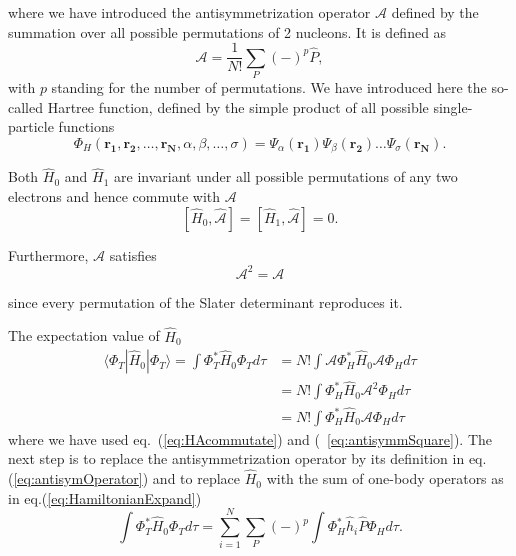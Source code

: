 where we have introduced the antisymmetrization operator $\mathcal{A}$ defined by the summation over all possible permutations of 2 nucleons. It is defined as
\begin{equation}
\label{eq:antisymOperator}
\mathcal{A}=\frac{1}{N!} \sum_P (-)^p \hat{P},
\end{equation}
with $p$ standing for the number of permutations. We have introduced here the so-called Hartree function, defined by the simple product of all possible single-particle functions
\begin{equation}
\Phi_H(\mathbf{r_1},\mathbf{r_2},\dots,\mathbf{r_N}, \alpha, \beta, \dots, \sigma)=\Psi_\alpha(\mathbf{r_1})\Psi_\beta(\mathbf{r_2}) \dots \Psi_\sigma(\mathbf{r_N}).
\end{equation}

Both $\hat{H}_0$ and $\hat{H}_1$ are invariant under all possible permutations of any two electrons and hence commute with $\mathcal{A}$
\begin{equation}
\label{eq:HAcommutate}
[\hat{H}_0,\hat{\mathcal{A}}]=[\hat{H}_1,\hat{\mathcal{A}}]=0.
\end{equation}

Furthermore, $\mathcal{A}$ satisfies
\begin{equation}
\label{eq:antisymmSquare}
\mathcal{A}^2=\mathcal{A}
\end{equation}

since every permutation of the Slater determinant reproduces it.

The expectation value of $\hat{H}_0$
\begin{align}
\nonumber
\langle \Phi_T | \hat{H}_0 | \Phi_T  \rangle= \int \Phi_T^*\hat{H}_0 \Phi_T d\tau &= N! \int \mathcal{A} \Phi_H^*\hat{H}_0 \mathcal{A} \Phi_H d\tau \\
\nonumber
&= N!  \int \Phi_H^*\hat{H}_0 \mathcal{A}^2 \Phi_H d\tau \\
\nonumber
&= N!  \int \Phi_H^*\hat{H}_0 \mathcal{A} \Phi_H d\tau
\end{align}
where we have used eq.~(\ref{eq:HAcommutate}) and (~\ref{eq:antisymmSquare}). The next step is to replace the antisymmetrization operator by its definition in eq.(\ref{eq:antisymOperator}) and to replace $\hat{H}_0$ with the sum of one-body operators as in eq.(\ref{eq:HamiltonianExpand})
\begin{equation}
\nonumber
\int \Phi_T^* \hat{H}_0 \Phi_T d\tau = \sum_{i=1}^N \sum_P (-)^p  \int \Phi_H^*\hat{h}_i \hat{P} \Phi_H d\tau.
\end{equation}


